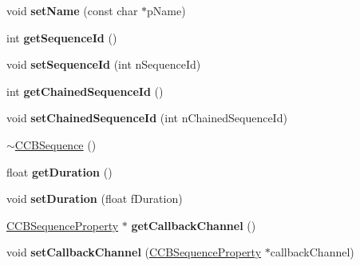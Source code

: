 \begin{DoxyCompactItemize}
\mbox{\label{classcocosbuilder_1_1CCBSequence_a143e989468951f096c4ed253a41a7baf}} 
void {\bfseries set\+Name} (const char $\ast$p\+Name)
\item 
\mbox{\label{classcocosbuilder_1_1CCBSequence_aef76e4700189aa03de7472f465fa4896}} 
int {\bfseries get\+Sequence\+Id} ()
\item 
\mbox{\label{classcocosbuilder_1_1CCBSequence_a7614e7beb913c27b00c78ef402a22771}} 
void {\bfseries set\+Sequence\+Id} (int n\+Sequence\+Id)
\item 
\mbox{\label{classcocosbuilder_1_1CCBSequence_a5e9f9575f1914e718f717d57b4143db6}} 
int {\bfseries get\+Chained\+Sequence\+Id} ()
\item 
\mbox{\label{classcocosbuilder_1_1CCBSequence_a332ae172ee08fc51e9258332e614b7a6}} 
void {\bfseries set\+Chained\+Sequence\+Id} (int n\+Chained\+Sequence\+Id)
\item 
\hyperlink{classcocosbuilder_1_1CCBSequence_a1700cc0f94b98bf29f717e169b921c9c}{$\sim$\+C\+C\+B\+Sequence} ()
\item 
\mbox{\label{classcocosbuilder_1_1CCBSequence_af3644d228c5cafaab6ae6c399de6b42d}} 
float {\bfseries get\+Duration} ()
\item 
\mbox{\label{classcocosbuilder_1_1CCBSequence_a2593737373c9f6d2901442ad45dde545}} 
void {\bfseries set\+Duration} (float f\+Duration)
\item 
\mbox{\label{classcocosbuilder_1_1CCBSequence_ae58c209b367a776a363b39999c32f0d0}} 
\hyperlink{classcocosbuilder_1_1CCBSequenceProperty}{C\+C\+B\+Sequence\+Property} $\ast$ {\bfseries get\+Callback\+Channel} ()
\item 
\mbox{\label{classcocosbuilder_1_1CCBSequence_ab88fcd5cb6697562785278c7b708aba1}} 
void {\bfseries set\+Callback\+Channel} (\hyperlink{classcocosbuilder_1_1CCBSequenceProperty}{C\+C\+B\+Sequence\+Property} $\ast$callback\+Channel)

\end{DoxyCompactItemize}

